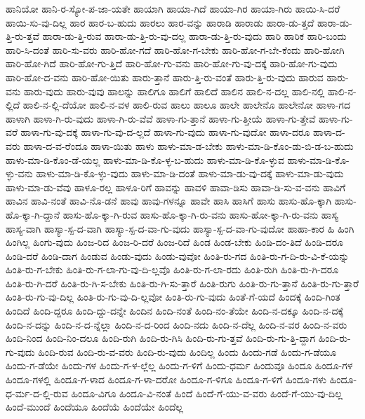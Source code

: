 {ಹಾನಿಯೋ
ಹಾನಿ-ರ-ಸ್ಯೋ-ಪ-ಜಾ-ಯತೇ
ಹಾಯಾಗಿ
ಹಾಯಾ-ಗಿದೆ
ಹಾಯಾ-ಗಿರ
ಹಾಯಾ-ಗಿರು
ಹಾಯಿ-ಸಿ-ದರೆ
ಹಾಯಿ-ಸು-ವು-ದಿಲ್ಲ
ಹಾರ
ಹಾರ-ಬ-ಹುದು
ಹಾರಲು
ಹಾರ-ವನ್ನು
ಹಾರಾಡಿ
ಹಾರಾಡು
ಹಾರಾ-ಡು-ತ್ತದೆ
ಹಾರಾ-ಡು-ತ್ತಿ-ರು-ತ್ತವೆ
ಹಾರಾ-ಡು-ತ್ತಿ-ರುವ
ಹಾರಾ-ಡು-ತ್ತಿ-ರು-ವು-ದಲ್ಲ
ಹಾರಾ-ಡು-ತ್ತಿ-ರು-ವುದು
ಹಾರಿ
ಹಾರಿಕ
ಹಾರಿ-ಬಂದು
ಹಾರಿ-ಸಿ-ದಂತೆ
ಹಾರಿ-ಸು-ವರು
ಹಾರಿ-ಹೋ-ಗದೆ
ಹಾರಿ-ಹೋ-ಗ-ಬೇಕು
ಹಾರಿ-ಹೋ-ಗ-ಬೇ-ಕೆಂದು
ಹಾರಿ-ಹೋಗಿ
ಹಾರಿ-ಹೋ-ಗಿದೆ
ಹಾರಿ-ಹೋ-ಗು-ತ್ತಿದೆ
ಹಾರಿ-ಹೋ-ಗು-ವನು
ಹಾರಿ-ಹೋ-ಗು-ವು-ದಕ್ಕೆ
ಹಾರಿ-ಹೋ-ಗು-ವುದು
ಹಾರಿ-ಹೋ-ದ-ವನು
ಹಾರಿ-ಹೋ-ಯಿತು
ಹಾರು-ತ್ತಾನೆ
ಹಾರು-ತ್ತಿ-ರು-ವಂತೆ
ಹಾರು-ತ್ತಿ-ರು-ವುದು
ಹಾರುವ
ಹಾರು-ವನು
ಹಾರು-ವುದು
ಹಾರು-ವುವು
ಹಾಲನ್ನು
ಹಾಲಿಗೂ
ಹಾಲಿಗೆ
ಹಾಲಿದೆ
ಹಾಲಿನ
ಹಾಲಿ-ನ-ದಲ್ಲ
ಹಾಲಿ-ನಲ್ಲಿ
ಹಾಲಿ-ನ-ಲ್ಲಿದೆ
ಹಾಲಿ-ನ-ಲ್ಲಿ-ದೆಯೋ
ಹಾಲಿ-ನ-ವಳ
ಹಾಲಿ-ರುವ
ಹಾಲು
ಹಾಲೂ
ಹಾಲೇ
ಹಾಲೇನೊ
ಹಾಲೇನೋ
ಹಾಳಾ-ಗದ
ಹಾಳಾಗಿ
ಹಾಳಾ-ಗಿ-ರು-ವುದು
ಹಾಳಾ-ಗಿ-ರು-ವೆವೆ
ಹಾಳಾ-ಗು-ತ್ತಾನೆ
ಹಾಳಾ-ಗು-ತ್ತೀಯೆ
ಹಾಳಾ-ಗು-ತ್ತೇವೆ
ಹಾಳಾ-ಗು-ವರೆ
ಹಾಳಾ-ಗು-ವು-ದಕ್ಕೆ
ಹಾಳಾ-ಗು-ವು-ದ-ಲ್ಲದೆ
ಹಾಳಾ-ಗು-ವುದು
ಹಾಳಾ-ಗು-ವುದೋ
ಹಾಳಾ-ದರೂ
ಹಾಳಾ-ದ-ವರು
ಹಾಳಾ-ದ-ವ-ರೆಂದೂ
ಹಾಳಾ-ಯಿತು
ಹಾಳು
ಹಾಳು-ಮಾ-ಡ-ಬೇಕು
ಹಾಳು-ಮಾ-ಡಿ-ಕೊಂ-ಡು-ಬಿ-ಡ-ಬ-ಹುದು
ಹಾಳು-ಮಾ-ಡಿ-ಕೊಂ-ಡೆ-ಯಲ್ಲ
ಹಾಳು-ಮಾ-ಡಿ-ಕೊ-ಳ್ಳ-ಬ-ಹುದು
ಹಾಳು-ಮಾ-ಡಿ-ಕೊ-ಳ್ಳುವ
ಹಾಳು-ಮಾ-ಡಿ-ಕೊ-ಳ್ಳು-ವನು
ಹಾಳು-ಮಾ-ಡಿ-ಕೊ-ಳ್ಳು-ವುದು
ಹಾಳು-ಮಾ-ಡಿ-ದಂತೆ
ಹಾಳು-ಮಾ-ಡು-ವು-ದಕ್ಕೆ
ಹಾಳು-ಮಾ-ಡು-ವುದು
ಹಾಳು-ಮಾ-ಡು-ವೆವು
ಹಾಳೂ-ರಲ್ಲ
ಹಾಳೂ-ರಿಗೆ
ಹಾವನ್ನು
ಹಾವಳಿ
ಹಾವಾ-ಡಿಸು
ಹಾವಾ-ಡಿ-ಸು-ವ-ವನು
ಹಾವಿಗೆ
ಹಾವಿನ
ಹಾವಿ-ನಂತೆ
ಹಾವಿ-ನೊ-ಡನೆ
ಹಾವು
ಹಾವು-ಗಳನ್ನೂ
ಹಾವೇ
ಹಾಸಿ
ಹಾಸಿಗೆ
ಹಾಸು
ಹಾಸು-ಹೊ-ಕ್ಕಾಗಿ
ಹಾಸು-ಹೊ-ಕ್ಕಾ-ಗಿ-ದ್ದಾನೆ
ಹಾಸು-ಹೊ-ಕ್ಕಾ-ಗಿ-ರುವ
ಹಾಸು-ಹೊ-ಕ್ಕಾ-ಗಿ-ರು-ವನು
ಹಾಸು-ಹೋ-ಕ್ಕಾ-ಗಿ-ರು-ವನು
ಹಾಸ್ಯ
ಹಾಸ್ಯ-ವಾಗಿ
ಹಾಸ್ಯಾ-ಸ್ಪ-ದ-ವಾಗಿ
ಹಾಸ್ಯಾ-ಸ್ಪ-ದ-ವಾ-ಗು-ವುದು
ಹಾಸ್ಯಾ-ಸ್ಪ-ದ-ವಾ-ಗು-ವುದೋ
ಹಾಹಾ-ಕಾರ
ಹಿ
ಹಿಂಗಿ
ಹಿಂಗಿಲ್ಲ
ಹಿಂಗು-ವುದು
ಹಿಂಜ-ರಿದ
ಹಿಂಜ-ರಿ-ದರೆ
ಹಿಂಜ-ರಿದೆ
ಹಿಂಡ
ಹಿಂಡ-ಬೇಕು
ಹಿಂಡಿ-ದಂ-ತಿದೆ
ಹಿಂಡಿ-ದರೂ
ಹಿಂಡಿ-ದರೆ
ಹಿಂಡಿ-ದಾಗ
ಹಿಂಡುವ
ಹಿಂಡು-ವುದು
ಹಿಂಡು-ವುವೋ
ಹಿಂತಿ-ರು-ಗದ
ಹಿಂತಿ-ರು-ಗ-ದಿ-ರು-ವಿ-ಕೆ-ಯನ್ನು
ಹಿಂತಿ-ರು-ಗ-ಬೇಕು
ಹಿಂತಿ-ರು-ಗ-ಲಾ-ಗು-ವು-ದಿ-ಲ್ಲವೊ
ಹಿಂತಿ-ರು-ಗ-ಲಾ-ರದು
ಹಿಂತಿ-ರುಗಿ
ಹಿಂತಿ-ರು-ಗಿ-ದರೂ
ಹಿಂತಿ-ರು-ಗಿ-ದರೆ
ಹಿಂತಿ-ರು-ಗಿ-ಸ-ಬೇಕು
ಹಿಂತಿ-ರು-ಗಿ-ಸು-ತ್ತಾರೆ
ಹಿಂತಿ-ರುಗು
ಹಿಂತಿ-ರು-ಗು-ತ್ತಾನೆ
ಹಿಂತಿ-ರು-ಗು-ತ್ತಾರೆ
ಹಿಂತಿ-ರು-ಗು-ವು-ದಿಲ್ಲ
ಹಿಂತಿ-ರು-ಗು-ವು-ದಿ-ಲ್ಲವೋ
ಹಿಂತಿ-ರು-ಗು-ವುದು
ಹಿಂತೆ-ಗೆ-ಯದೆ
ಹಿಂದಕ್ಕೆ
ಹಿಂದಿ-ಗಿಂತ
ಹಿಂದಿದೆ
ಹಿಂದಿ-ದ್ದರೂ
ಹಿಂದಿ-ದ್ದು-ದನ್ನೇ
ಹಿಂದಿನ
ಹಿಂದಿ-ನಂತೆ
ಹಿಂದಿ-ನಂ-ತೆಯೇ
ಹಿಂದಿ-ನ-ದಕ್ಕೂ
ಹಿಂದಿ-ನ-ದಕ್ಕೆ
ಹಿಂದಿ-ನ-ದನ್ನು
ಹಿಂದಿ-ನ-ದ-ನ್ನೆಲ್ಲಾ
ಹಿಂದಿ-ನ-ದ-ರಿಂದ
ಹಿಂದಿ-ನದು
ಹಿಂದಿ-ನ-ದೆಲ್ಲ
ಹಿಂದಿ-ನ-ವರ
ಹಿಂದಿ-ನ-ವರು
ಹಿಂದಿ-ನಿಂದ
ಹಿಂದಿ-ನಿಂ-ದಲೂ
ಹಿಂದಿ-ರುಗಿ
ಹಿಂದಿ-ರು-ಗಿಸಿ
ಹಿಂದಿ-ರು-ಗು-ತ್ತವೆ
ಹಿಂದಿ-ರು-ಗು-ತ್ತಿ-ದ್ದಾಗ
ಹಿಂದಿ-ರು-ಗು-ವುದು
ಹಿಂದಿ-ರುವ
ಹಿಂದಿ-ರು-ವ-ವರು
ಹಿಂದಿ-ರು-ವುದು
ಹಿಂದಿಲ್ಲ
ಹಿಂದು
ಹಿಂದು-ಗಡೆ
ಹಿಂದು-ಗ-ಡೆಯೂ
ಹಿಂದು-ಗ-ಡೆಯೇ
ಹಿಂದು-ಗಳ
ಹಿಂದು-ಗ-ಳ-ಲ್ಲೆಲ್ಲ
ಹಿಂದು-ಗ-ಳಿಗೆ
ಹಿಂದು-ಧರ್ಮ
ಹಿಂದುವೂ
ಹಿಂದೂ
ಹಿಂದೂ-ಗಳ
ಹಿಂದೂ-ಗಳಲ್ಲಿ
ಹಿಂದೂ-ಗ-ಳಾದ
ಹಿಂದೂ-ಗ-ಳಾ-ದರೋ
ಹಿಂದೂ-ಗ-ಳಿಗೂ
ಹಿಂದೂ-ಗ-ಳಿಗೆ
ಹಿಂದೂ-ಗಳು
ಹಿಂದೂ-ಧ-ರ್ಮ-ದ-ಲ್ಲಿ-ರುವ
ಹಿಂದೂ-ವಿಗೂ
ಹಿಂದೂ-ವಿ-ನಂತೆ
ಹಿಂದೆ
ಹಿಂದೆ-ಗೆ-ಯು-ವ-ವರು
ಹಿಂದೆ-ಗೆ-ಯು-ವು-ದಿಲ್ಲ
ಹಿಂದೆ-ಮುಂದೆ
ಹಿಂದೆಯೂ
ಹಿಂದೆಯೆ
ಹಿಂದೆಯೇ
ಹಿಂದೆಲ್ಲ
}
